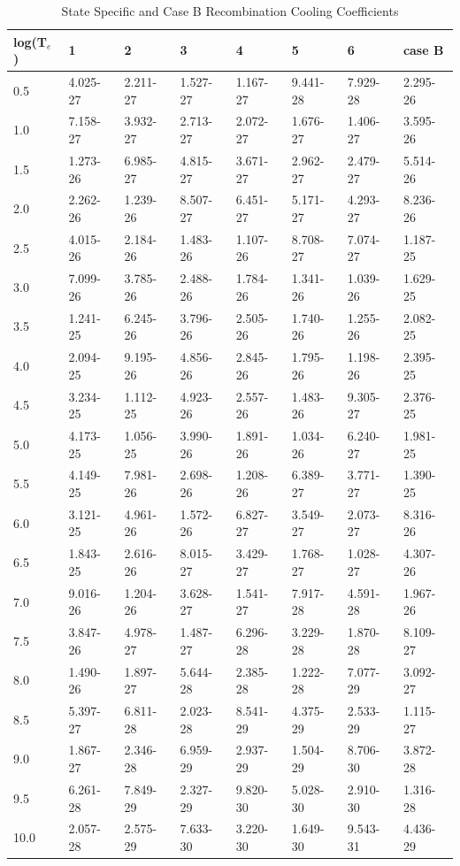 \begin{table}
\label{tab:RecombinCoolingCoeffic}
\caption{State Specific and Case B Recombination Cooling Coefficients}
\begin{tabular}{llllllll}
\hline
log(T$_e$)& 1&  2&  3&  4&  5&  6&  case B\\
\hline
0.5& 4.025-27&
2.211-27& 1.527-27& 1.167-27& 9.441-28& 7.929-28& 2.295-26\\
1.0&
7.158-27& 3.932-27& 2.713-27& 2.072-27& 1.676-27& 1.406-27& 3.595-26\\
1.5&      1.273-26& 6.985-27& 4.815-27& 3.671-27& 2.962-27& 2.479-27&
5.514-26\\
2.0&      2.262-26& 1.239-26& 8.507-27& 6.451-27& 5.171-27&
4.293-27& 8.236-26\\
2.5 &     4.015-26& 2.184-26& 1.483-26& 1.107-26&
8.708-27& 7.074-27& 1.187-25\\
3.0&      7.099-26& 3.785-26& 2.488-26&
1.784-26& 1.341-26& 1.039-26& 1.629-25\\
3.5&      1.241-25& 6.245-26&
3.796-26& 2.505-26& 1.740-26& 1.255-26& 2.082-25\\
4.0&      2.094-25&
9.195-26& 4.856-26& 2.845-26& 1.795-26& 1.198-26& 2.395-25\\
4.5&
3.234-25& 1.112-25& 4.923-26& 2.557-26& 1.483-26& 9.305-27& 2.376-25\\
5.0&      4.173-25& 1.056-25& 3.990-26& 1.891-26& 1.034-26& 6.240-27&
1.981-25\\
5.5&      4.149-25& 7.981-26& 2.698-26& 1.208-26& 6.389-27&
3.771-27& 1.390-25\\
6.0&      3.121-25& 4.961-26& 1.572-26& 6.827-27&
3.549-27& 2.073-27& 8.316-26\\
6.5&      1.843-25& 2.616-26& 8.015-27&
3.429-27& 1.768-27& 1.028-27& 4.307-26\\
7.0&      9.016-26& 1.204-26&
3.628-27& 1.541-27& 7.917-28& 4.591-28& 1.967-26\\
7.5&      3.847-26&
4.978-27& 1.487-27& 6.296-28& 3.229-28& 1.870-28& 8.109-27\\
8.0&
1.490-26& 1.897-27& 5.644-28& 2.385-28& 1.222-28& 7.077-29& 3.092-27\\
8.5&      5.397-27& 6.811-28& 2.023-28& 8.541-29& 4.375-29& 2.533-29&
1.115-27\\
9.0&      1.867-27& 2.346-28& 6.959-29& 2.937-29& 1.504-29&
8.706-30& 3.872-28\\
9.5&      6.261-28& 7.849-29& 2.327-29& 9.820-30&
5.028-30& 2.910-30& 1.316-28\\
10.0&      2.057-28& 2.575-29& 7.633-30&
3.220-30& 1.649-30& 9.543-31& 4.436-29\\
\hline
\end{tabular}
\end{table}

